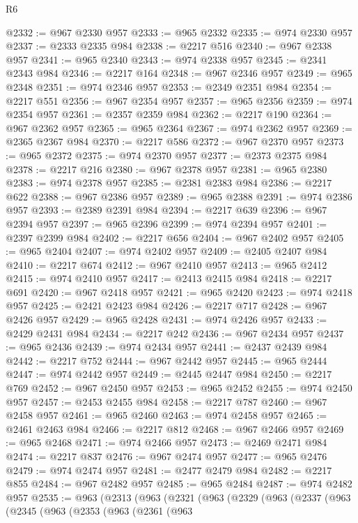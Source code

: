 \begin{lexlean}{R6}
\begin{coremodule}
@2332 := @967 @2330 @957
@2333 := @965 @2332
@2335 := @974 @2330 @957
@2337 := @2333 @2335 @984
@2338 := @2217 @516
@2340 := @967 @2338 @957
@2341 := @965 @2340
@2343 := @974 @2338 @957
@2345 := @2341 @2343 @984
@2346 := @2217 @164
@2348 := @967 @2346 @957
@2349 := @965 @2348
@2351 := @974 @2346 @957
@2353 := @2349 @2351 @984
@2354 := @2217 @551
@2356 := @967 @2354 @957
@2357 := @965 @2356
@2359 := @974 @2354 @957
@2361 := @2357 @2359 @984
@2362 := @2217 @190
@2364 := @967 @2362 @957
@2365 := @965 @2364
@2367 := @974 @2362 @957
@2369 := @2365 @2367 @984
@2370 := @2217 @586
@2372 := @967 @2370 @957
@2373 := @965 @2372
@2375 := @974 @2370 @957
@2377 := @2373 @2375 @984
@2378 := @2217 @216
@2380 := @967 @2378 @957
@2381 := @965 @2380
@2383 := @974 @2378 @957
@2385 := @2381 @2383 @984
@2386 := @2217 @622
@2388 := @967 @2386 @957
@2389 := @965 @2388
@2391 := @974 @2386 @957
@2393 := @2389 @2391 @984
@2394 := @2217 @639
@2396 := @967 @2394 @957
@2397 := @965 @2396
@2399 := @974 @2394 @957
@2401 := @2397 @2399 @984
@2402 := @2217 @656
@2404 := @967 @2402 @957
@2405 := @965 @2404
@2407 := @974 @2402 @957
@2409 := @2405 @2407 @984
@2410 := @2217 @674
@2412 := @967 @2410 @957
@2413 := @965 @2412
@2415 := @974 @2410 @957
@2417 := @2413 @2415 @984
@2418 := @2217 @691
@2420 := @967 @2418 @957
@2421 := @965 @2420
@2423 := @974 @2418 @957
@2425 := @2421 @2423 @984
@2426 := @2217 @717
@2428 := @967 @2426 @957
@2429 := @965 @2428
@2431 := @974 @2426 @957
@2433 := @2429 @2431 @984
@2434 := @2217 @242
@2436 := @967 @2434 @957
@2437 := @965 @2436
@2439 := @974 @2434 @957
@2441 := @2437 @2439 @984
@2442 := @2217 @752
@2444 := @967 @2442 @957
@2445 := @965 @2444
@2447 := @974 @2442 @957
@2449 := @2445 @2447 @984
@2450 := @2217 @769
@2452 := @967 @2450 @957
@2453 := @965 @2452
@2455 := @974 @2450 @957
@2457 := @2453 @2455 @984
@2458 := @2217 @787
@2460 := @967 @2458 @957
@2461 := @965 @2460
@2463 := @974 @2458 @957
@2465 := @2461 @2463 @984
@2466 := @2217 @812
@2468 := @967 @2466 @957
@2469 := @965 @2468
@2471 := @974 @2466 @957
@2473 := @2469 @2471 @984
@2474 := @2217 @837
@2476 := @967 @2474 @957
@2477 := @965 @2476
@2479 := @974 @2474 @957
@2481 := @2477 @2479 @984
@2482 := @2217 @855
@2484 := @967 @2482 @957
@2485 := @965 @2484
@2487 := @974 @2482 @957
@2535 := @963
    (@2313
      (@963
        (@2321
          (@963
            (@2329
              (@963
                (@2337
                  (@963
                    (@2345
                      (@963
                        (@2353
                          (@963
                            (@2361
                              (@963

\end{coremodule}
\end{lexlean}
